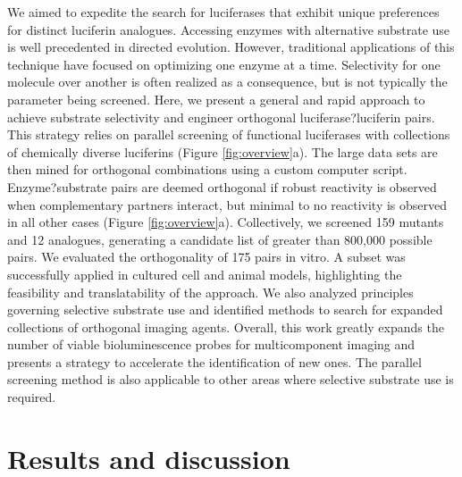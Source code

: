 We aimed to expedite the search for luciferases that exhibit unique preferences for distinct luciferin analogues. Accessing enzymes with alternative substrate use is well precedented in directed evolution.\cite{Renata:2015is,Packer:2015ku,Goldsmith:2012bk} However, traditional applications of this technique have focused on optimizing one enzyme at a time. Selectivity for one molecule over another is often realized as a consequence, but is not typically the parameter being screened.\cite{Taylor:2015gd,Feng:2015he,Neumann:2010bz,Lang:2014dj,Owens:2017gp,Wan:2010hk} Here, we present a
  general and rapid approach to achieve substrate selectivity and engineer orthogonal luciferase?luciferin pairs. This strategy relies on parallel screening of functional luciferases with collections of chemically diverse luciferins (Figure \ref{fig:overview}a). The large data sets are then mined for orthogonal combinations using a custom computer script. Enzyme?substrate pairs are deemed orthogonal if robust reactivity is observed when complementary partners interact, but minimal to no reactivity is observed in all other cases (Figure \ref{fig:overview}a). Collectively, we screened 159 mutants and 12 analogues, generating a candidate list of greater than 800,000 possible pairs. We evaluated the orthogonality of 175 pairs in vitro. A subset was successfully applied in cultured cell and animal models, highlighting the feasibility and translatability of the approach. We also analyzed principles governing selective substrate use and identified methods to search for expanded collections of orthogonal imaging agents. Overall, this work greatly expands the number of viable bioluminescence probes for multicomponent imaging and presents a strategy to accelerate the identification of new ones. The parallel screening method is also applicable to other areas where selective substrate use is required.

\section{Results and discussion}

